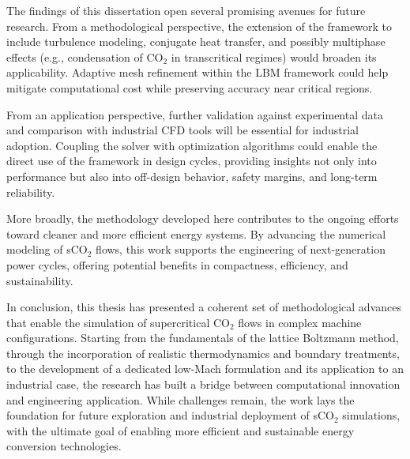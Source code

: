 
The findings of this dissertation open several promising avenues for future
research. From a methodological perspective, the extension of the framework to
include turbulence modeling, conjugate heat transfer, and possibly multiphase
effects (e.g., condensation of CO$_2$ in transcritical regimes) would broaden
its applicability. Adaptive mesh refinement within the LBM framework could help
mitigate computational cost while preserving accuracy near critical regions.  

From an application perspective, further validation against experimental data
and comparison with industrial CFD tools will be essential for industrial
adoption. Coupling the solver with optimization algorithms could enable the
direct use of the framework in design cycles, providing insights not only into
performance but also into off-design behavior, safety margins, and long-term
reliability.  

More broadly, the methodology developed here contributes to the ongoing efforts
toward cleaner and more efficient energy systems. By advancing the numerical
modeling of sCO$_2$ flows, this work supports the engineering of next-generation
power cycles, offering potential benefits in compactness, efficiency, and
sustainability.  


In conclusion, this thesis has presented a coherent set of methodological
advances that enable the simulation of supercritical CO$_2$ flows in complex
machine configurations. Starting from the fundamentals of the lattice Boltzmann
method, through the incorporation of realistic thermodynamics and boundary
treatments, to the development of a dedicated low-Mach formulation and its
application to an industrial case, the research has built a bridge between
computational innovation and engineering application. While challenges remain,
the work lays the foundation for future exploration and industrial deployment of
sCO$_2$ simulations, with the ultimate goal of enabling more efficient and
sustainable energy conversion technologies. 
